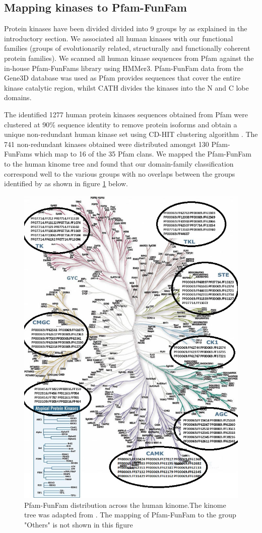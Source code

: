 \documentclass[a4paper, 11pt]{article}
\newcommand{\redcomment}[1]{\textcolor{red}{[#1]}} %
\begin{document}
\subsection*{Mapping kinases to Pfam-FunFam}
Protein kinases have been divided divided into 9 groups by \cite{manning2002protein} as explained in the introductory section. We associated all human kinases with our functional families (groups of evolutionarily related, structurally and functionally coherent protein families). We scanned all human kinase sequences from Pfam against the in-house Pfam-FunFams library using HMMer3. Pfam-FunFam data from the Gene3D database was used as Pfam provides sequences that cover the entire kinase catalytic region, whilst CATH divides the kinases into the N and C lobe domains.\par
The identified 1277 human protein kinases sequences obtained from Pfam were clustered at 90\% sequence identity to remove protein isoforms and obtain a unique non-redundant human kinase set using CD-HIT clustering algorithm \cite{li2006cd}. The 741 non-redundant kinases obtained were distributed amongst 130 Pfam-FunFams which map to 16 of the 35 Pfam clans. We mapped the Pfam-FunFam to the human kinome tree and found that our domain-family classification correspond well to the various groups with no overlaps between the groups identified by \cite{manning2002protein} as shown in figure \ref{kinasetree} below. %
\begin{figure}[H]
	\includegraphics[width=.8\linewidth]{figures/kinometree.jpg}
	\centering
	\caption{Pfam-FunFam distribution across the human kinome.The kinome tree was adapted from \cite{manning2002protein}. The mapping of Pfam-FunFam to the group "Others" is not shown in this figure}
	\label{kinasetree}
\end{figure}
\end{document}
